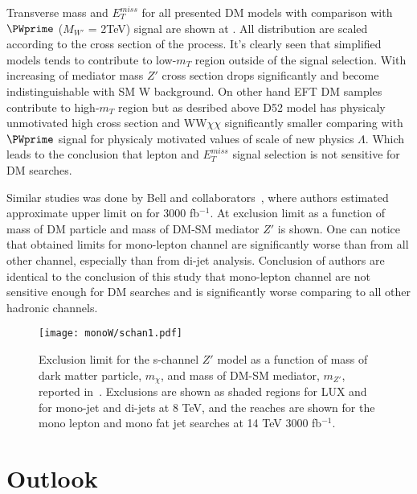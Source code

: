 Transverse mass and $E_{T}^{miss}$ for all presented DM models with comparison with $\PWprime$ ($M_{W'}$ = 2TeV) signal are shown at .
All distribution are scaled according to the cross section of the process. It's clearly seen that simplified models tends to contribute to low-$m_{T}$ region
outside of the signal selection. With increasing of mediator mass $Z'$ cross section drops significantly and become indistinguishable with SM W background.
On other hand EFT DM samples contribute to high-$m_{T}$ region but as desribed above D52 model has physicaly unmotivated high cross section and WW$\chi\chi$ 
significantly smaller comparing with $\PWprime$ signal for physicaly motivated values of scale of new physics $\Lambda$. Which leads to the conclusion that
lepton and $E_{T}^{miss}$ signal selection is not sensitive for DM searches.



Similar studies was done by Bell and collaborators~\cite{arXiv:1512.00476}, where authors estimated approximate upper limit on for 3000 fb$^{-1}$. 
At  exclusion limit
as a function of mass of DM particle and mass of DM-SM mediator $Z'$ is shown. One can notice that obtained limits for mono-lepton channel are significantly 
worse than from all other channel, especially than from di-jet analysis. Conclusion of authors are identical to the conclusion of this study that mono-lepton channel
are not sensitive enough for DM searches and is significantly worse comparing to all other hadronic channels.

\begin{figure}[]
 \texttt{[image: monoW/schan1.pdf]}
  \caption{Exclusion limit for the s-channel $Z'$ model as a function of mass of dark matter particle, $m_{\chi}$, 
  and mass of DM-SM mediator, $m_{Z'}$, reported in~\cite{arXiv:1512.00476}.
  Exclusions are shown as shaded regions for LUX and for mono-jet and di-jets at 8 TeV, 
  and the reaches are shown for the mono lepton and mono fat jet searches at 14 TeV 3000 fb$^{-1}$.}
  \label{fig:bellExclLim}
\end{figure}

\section{Outlook}
\label{sec:wprimeConclusion}
